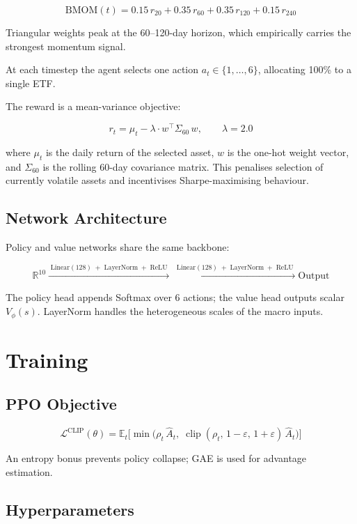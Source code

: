 \documentclass[11pt, a4paper]{article}
\begin{document}
\[
  \text{BMOM}(t) = 0.15\,r_{20} + 0.35\,r_{60} + 0.35\,r_{120} + 0.15\,r_{240}
\]

Triangular weights peak at the 60--120-day horizon, which empirically carries the strongest momentum signal.

At each timestep the agent selects one action $a_t \in \{1,\ldots,6\}$, allocating 100\% to a single ETF.

The reward is a mean-variance objective:

\[
  r_t = \mu_t - \lambda \cdot w^\top \Sigma_{60}\, w, \qquad \lambda = 2.0
\]

where $\mu_t$ is the daily return of the selected asset, $w$ is the one-hot weight vector, and $\Sigma_{60}$ is the rolling 60-day covariance matrix. This penalises selection of currently volatile assets and incentivises Sharpe-maximising behaviour.

\subsection{Network Architecture}

Policy and value networks share the same backbone:

\[
\mathbb{R}^{10}
\xrightarrow{\;\text{Linear}(128)\;+\;\text{LayerNorm}\;+\;\text{ReLU}\;}
\xrightarrow{\;\text{Linear}(128)\;+\;\text{LayerNorm}\;+\;\text{ReLU}\;}
\text{Output}
\]

The policy head appends Softmax over 6 actions; the value head outputs scalar $V_\phi(s)$. LayerNorm handles the heterogeneous scales of the macro inputs.

\section{Training}

\subsection{PPO Objective}

\[
\mathcal{L}^{\text{CLIP}}(\theta) = \mathbb{E}_t \Big[
  \min\!\Big(
    \rho_t\, \hat{A}_t,\;
    \operatorname{clip}(\rho_t,\, 1{-}\varepsilon,\, 1{+}\varepsilon)\, \hat{A}_t
  \Big)
\Big]
\]

An entropy bonus prevents policy collapse; GAE is used for advantage estimation.

\subsection{Hyperparameters}
\end{document}
